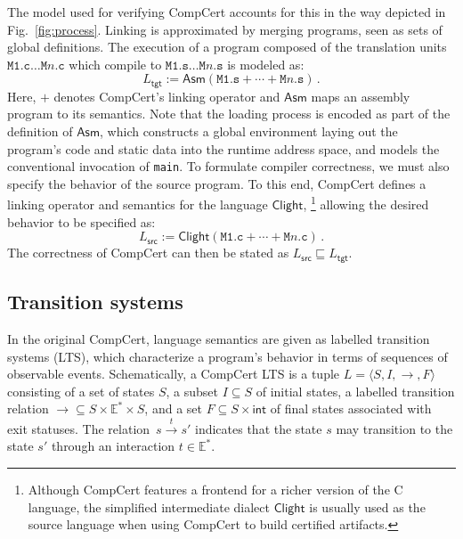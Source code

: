 \documentclass[draft,11pt]{report}
\newcommand{\kw}[1]{\ensuremath{ \mathsf{#1} }}
\newcommand{\refby}{\sqsubseteq} %
\begin{document}
The model used for verifying CompCert accounts for this
in the way depicted in Fig.~\ref{fig:process}.
Linking is approximated by
merging programs, seen as sets of global definitions.
The execution
of a program composed of the translation units
$\texttt{M1.c} \ldots \texttt{M$n$.c}$
which compile to
$\texttt{M1.s} \ldots \texttt{M$n$.s}$
is modeled as:
\[
    L_\kw{tgt} :=
    \kw{Asm}(\texttt{M1.s} +
             \cdots +
             \texttt{M$n$.s}) \,.
\]
Here,
$+$ denotes CompCert's linking operator and
$\kw{Asm}$ maps an assembly program to its semantics.
Note that the loading process is encoded
as part of the definition of $\kw{Asm}$,
which constructs a global environment
laying out the program's code and static data
into the runtime address space,
and models the conventional invocation of \texttt{main}.
To formulate compiler correctness,
we must also specify the behavior of the source program.
To this end,
CompCert defines a linking operator
and semantics
for the language $\kw{Clight}$,%
\footnote{
  Although CompCert features a frontend for a richer version
  of the C language,
  the simplified intermediate dialect \kw{Clight}
  is usually used as the source language
  when using CompCert to build certified artifacts.
}
allowing the desired behavior to be specified as:
\[
    L_\kw{src} :=
    \kw{Clight}(\texttt{M1.c} + \cdots + \texttt{M$n$.c}) \,.
\]
The correctness of CompCert
can then be stated as $L_\kw{src} \refby L_\kw{tgt}$.

\subsection{Transition systems} %

In the original CompCert, language semantics are
given as labelled transition systems (LTS),
which characterize a program's behavior in terms of
sequences of observable events.
Schematically, a CompCert LTS
is a tuple
$L = \langle S, I, {\rightarrow}, F \rangle$
consisting of
a set of states $S$,
a subset $I \subseteq S$ of initial states,
a labelled transition relation
${\rightarrow} \subseteq S \times \mathbb{E}^* \times S$,
and a set
$F \subseteq S \times \kw{int}$
of final states associated with exit statuses.
The relation~$s \stackrel{t}{\rightarrow} s'$
indicates that the state $s$ may transition to the state $s'$
through an interaction $t \in \mathbb{E}^*$.
\end{document}
